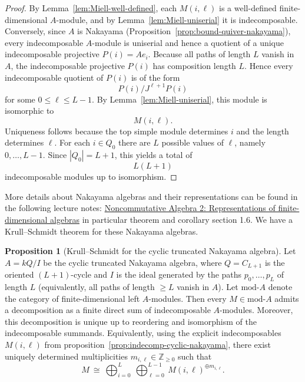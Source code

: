 \documentclass{article}
\theoremstyle{definition}
\newtheorem{proposition}[theorem]{Proposition}
\begin{document}
\begin{proof}
By Lemma~\ref{lem:Miell-well-defined}, each $M(i,\ell)$ is a well-defined
finite-dimensional $A$-module, and by Lemma~\ref{lem:Miell-uniserial}
it is indecomposable.
\noindent
Conversely, since $A$ is Nakayama
(Proposition~\ref{prop:bound-quiver-nakayama}),
every indecomposable $A$-module is uniserial and hence a quotient of a unique
indecomposable projective $P(i)=Ae_i$.
\noindent
Because all paths of length $L$ vanish in $A$, the indecomposable projective
$P(i)$ has composition length $L$. Hence every indecomposable quotient of
$P(i)$ is of the form
\[
P(i)/J^{\ell+1}P(i)
\]
for some $0\le \ell \le L-1$.
\noindent
By Lemma~\ref{lem:Miell-uniserial}, this module is isomorphic to
\[
M(i,\ell).
\]
\noindent
Uniqueness follows because the top simple module determines $i$ and the
length determines $\ell$.
\noindent
For each $i\in Q_0$ there are $L$ possible values of $\ell$, namely
$0,\dots,L-1$. Since $|Q_0|=L+1$, this yields a total of
\[
L(L+1)
\]
indecomposable modules up to isomorphism.
\end{proof}
\noindent
More details about Nakayama algebras and their representations can be found in the following lecture notes:
\href{https://www.math.uni-bielefeld.de/~wcrawley/1920noncommalg2/NA2.pdf}{Noncommutative Algebra 2: Representations of finite-dimensional algebras} in particular theorem and corollary section 1.6.
We have a Krull--Schmidt theorem for these Nakayama algebras.
\begin{proposition}[Krull--Schmidt for the cyclic truncated Nakayama algebra]\label{prop:KS-cyclic-truncated-nakayama}
Let $A=kQ/I$ be the cyclic truncated Nakayama algebra, where $Q=C_{L+1}$ is the oriented $(L+1)$-cycle and $I$ is the ideal generated by the paths $p_0,\dots,p_{L}$ of length $L$ (equivalently, all paths of length $\ge L$ vanish in $A$).
Let $\mathrm{mod}\text{-}A$ denote the category of finite-dimensional left $A$-modules.
\noindent
Then every $M\in \mathrm{mod}\text{-}A$ admits a decomposition as a finite direct sum of indecomposable $A$-modules.
Moreover, this decomposition is unique up to reordering and isomorphism of the indecomposable summands.
\noindent
Equivalently, using the explicit indecomposables $M(i,\ell)$ from proposition~\ref{prop:indecomp-cyclic-nakayama}, there exist uniquely determined multiplicities
$m_{i,\ell}\in\mathbb{Z}_{\ge 0}$ such that
\[
M \ \cong\ \bigoplus_{i=0}^{L} \ \bigoplus_{\ell=0}^{L-1} \ M(i,\ell)^{\oplus m_{i,\ell}}.
\]
\end{proposition}
\end{document}
